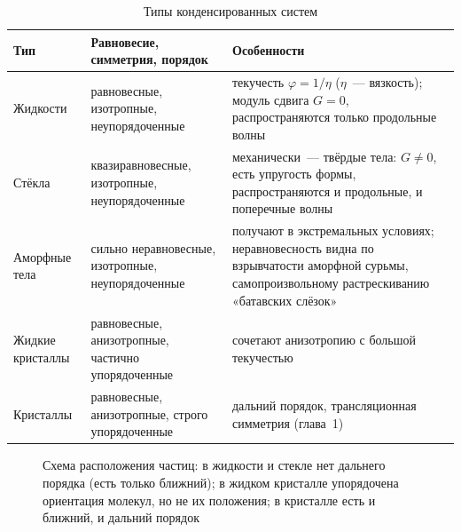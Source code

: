 \begin{table}[ht]
\centering
\caption{Типы конденсированных систем}
\label{tab:condensed}
\small
\begin{tabularx}{\textwidth}{@{}l>{\raggedright\arraybackslash}p{33mm}>{\raggedright\arraybackslash}X@{}}
\toprule
Тип & Равновесие, симметрия, порядок & Особенности \\
\midrule
Жидкости & равновесные, изотропные, неупорядоченные & текучесть $\varphi=1/\eta$ ($\eta$~— вязкость); модуль сдвига $G=0$, распространяются только продольные волны \\
Стёкла & квази\-равновесные, изотропные, неупорядоченные & механически~— твёрдые тела: $G\neq0$, есть упругость формы, распространяются и продольные, и поперечные волны \\
Аморфные тела & сильно неравновесные, изотропные, неупорядоченные & получают в экстремальных условиях; неравновесность видна по взрывчатости аморфной сурьмы, самопроизвольному растрескиванию «батавских слёзок» \\
Жидкие кристаллы & равновесные, анизотропные, частично упорядоченные & сочетают анизотропию с большой текучестью \\
Кристаллы & равновесные, анизотропные, строго упорядоченные & дальний порядок, трансляционная симметрия (глава~1) \\
\bottomrule
\end{tabularx}
\end{table}

\begin{figure}[ht]
\centering
{}
\caption{Схема расположения частиц: в жидкости и стекле нет дальнего
порядка (есть только ближний); в жидком кристалле упорядочена ориентация
молекул, но не их положения; в кристалле есть и ближний, и дальний порядок}
\label{fig:condensed}
\end{figure}
